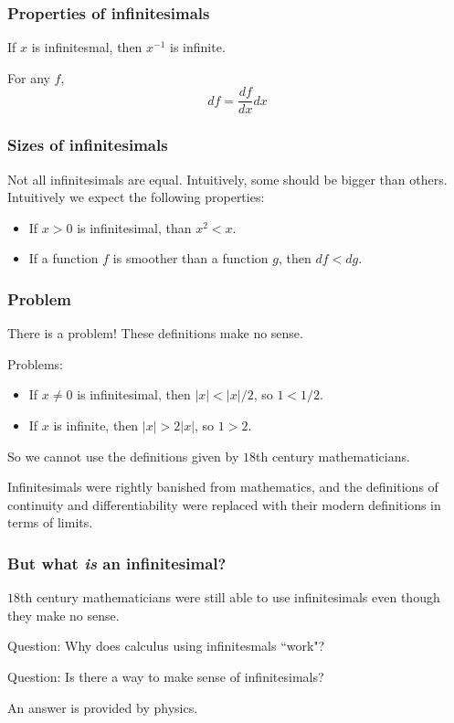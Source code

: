 \documentclass{beamer}
\begin{document}
\begin{frame}
\frametitle{Properties of infinitesimals}
\begin{lemma}
    If $x$ is infinitesmal, then $x^{-1}$ is infinite.
\end{lemma} 
\begin{lemma}
    For any $f$,
    \begin{equation*}
        df = \frac{df}{dx}dx
    \end{equation*}
\end{lemma}
\end{frame}

\begin{frame}
\frametitle{Sizes of infinitesimals}
Not all infinitesimals are equal. Intuitively, some should be bigger than others.
Intuitively we expect the following properties:
\begin{itemize}
\item{} If $x > 0$ is infinitesimal, than $x^2 < x$.
\item{} If a function $f$ is smoother than a function $g$, then $df < dg$.
\end{itemize}
\end{frame}

\begin{frame}
\frametitle{Problem}
There is a problem! These definitions make no sense.
\begin{block}
{Problems:}
\begin{itemize}
    \item{} If $x \neq 0$ is infinitesimal, then $|x| < |x|/2$, so $1 < 1/2$.

    \item{} If $x$ is infinite, then $|x| > 2|x|$, so $1 > 2$.
\end{itemize}
\end{block}

So we cannot use the definitions given by $18$th century mathematicians.
\end{frame}
\begin{frame}
    Infinitesimals were rightly banished from mathematics, and the definitions
    of continuity and differentiability were replaced with their modern 
    definitions in terms of limits.
\end{frame}

\begin{frame}
\frametitle{But what \emph{is} an infinitesimal?}
$18$th century mathematicians were still able to use infinitesimals
even though they make no sense. 
\begin{block}
    {Question:}
    Why does calculus using infinitesmals ``work"?
\end{block}
\begin{block}
    {Question:}
    Is there a way to make sense of infinitesimals?
\end{block}
An answer is provided by physics.
\end{frame}
\end{document}
